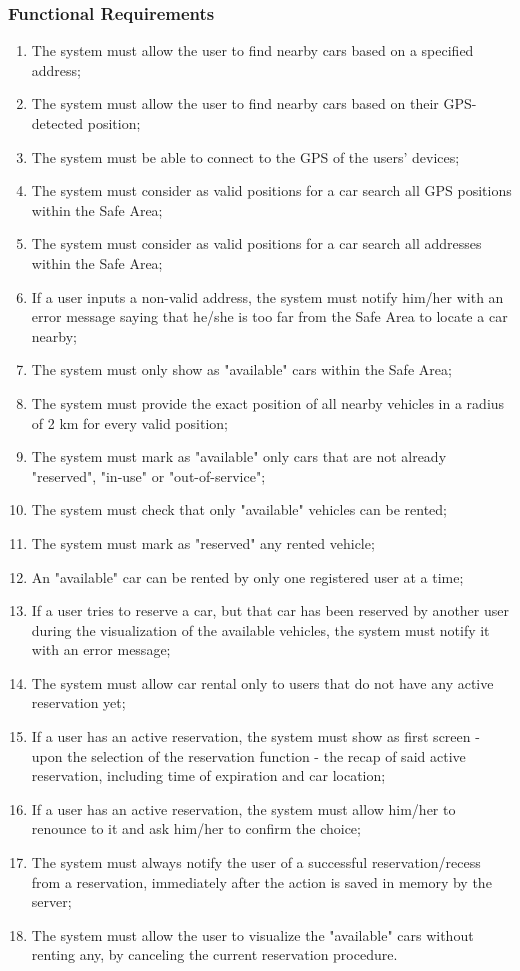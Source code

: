 \subsubsection{Functional Requirements}
\begin{enumerate}
\item The system must allow the user to find nearby cars based on a specified address;
\item The system must allow the user to find nearby cars based on their GPS-detected position;
\item The system must be able to connect to the GPS of the users' devices;
\item The system must consider as valid positions for a car search all GPS positions within the Safe Area;
\item The system must consider as valid positions for a car search all addresses within the Safe Area;
\item If a user inputs a non-valid address, the system must notify him/her with an error message saying that he/she is too far from the Safe Area to locate a car nearby;
\item The system must only show as "available" cars within the Safe Area;
\item The system must provide the exact position of all nearby vehicles in a radius of 2 km for every valid position;
\item The system must mark as "available" only cars that are not already "reserved", "in-use" or "out-of-service";
\item The system must check that only "available" vehicles can be rented;
\item The system must mark as "reserved" any rented vehicle;
\item An "available" car can be rented by only one registered user at a time;
\item If a user tries to reserve a car, but that car has been reserved by another user during the visualization of the available vehicles, the system must notify it with an error message;
\item The system must allow car rental only to users that do not have any active reservation yet;
\item If a user has an active reservation, the system must show as first screen - upon the selection of the reservation function - the recap of said active reservation, including time of expiration and car location;
\item If a user has an active reservation, the system must allow him/her to renounce to it and ask him/her to confirm the choice;
\item The system must always notify the user of a successful reservation/recess from a reservation, immediately after the action is saved in memory by the server;
\item The system must allow the user to visualize the "available" cars without renting any, by canceling the current reservation procedure.
\end{enumerate}

